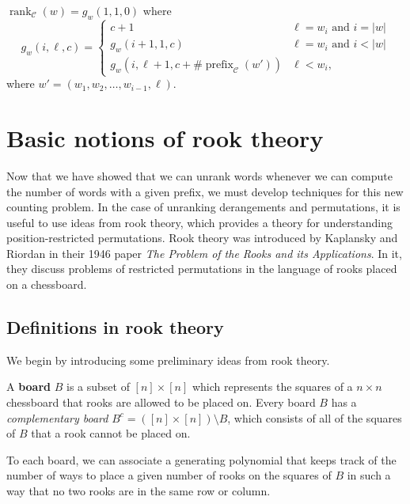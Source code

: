 \begin{claim}
  ${\operatorname{rank}_\mathcal{C}(w) = g_w(1,1,0)}$ where
  \begin{equation}
    g_w(i, \ell, c) = \begin{cases}
      c + 1 & \ell = w_i \text{ and } i = |w| \\
      g_w(i + 1, 1, c) & \ell = w_i \text{ and } i < |w| \\
      g_w(i, \ell + 1, c + \#\operatorname{prefix}_\mathcal{C}(w')) & \ell < w_i,
    \end{cases}
  \end{equation}
  where $w' = (w_1, w_2, \dots, w_{i-1}, \ell)$.
\end{claim}

\section{Basic notions of rook theory}
Now that we have showed that we can unrank words whenever we can compute the
number of words with a given prefix, we must develop techniques for this new
counting problem.
In the case of unranking derangements and permutations, it is useful to use
ideas from rook theory, which provides a theory for understanding
position-restricted permutations.
Rook theory was introduced by Kaplansky and Riordan \cite{Kaplansky1946}
in their 1946 paper \textit{The Problem of the Rooks and its Applications}. In
it, they discuss problems of restricted permutations in the language of rooks
placed on a chessboard.



\subsection{Definitions in rook theory}
We begin by introducing some preliminary ideas from rook theory.

\begin{definition}
  A \textbf{board} $B$ is a subset of $[n] \times [n]$ which represents the
  squares of a $n \times n$ chessboard that rooks are allowed to be placed on.
  Every board $B$ has a \textit{complementary board}
  $B^c = ([n] \times [n]) \setminus B$, which consists of all of the
  squares of $B$ that a rook cannot be placed on.
\end{definition}

To each board, we can associate a generating polynomial that keeps track of the
number of ways to place a given number of rooks on the squares of $B$ in such a
way that no two rooks are in the same row or column.

